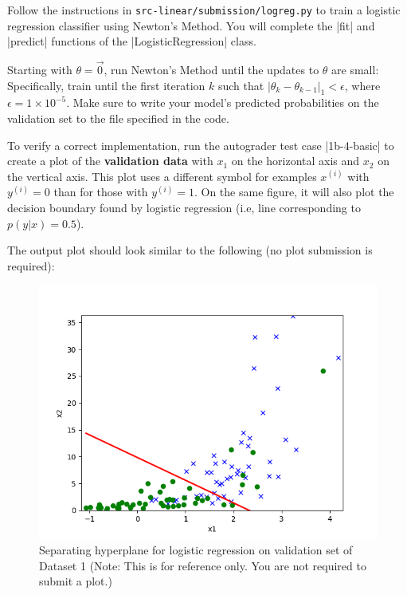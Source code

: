 \item {}
Follow the instructions in \texttt{src-linear/submission/logreg.py} to train a logistic regression classifier using Newton's Method. You will complete the |fit| and |predict| functions of the |LogisticRegression| class.

Starting with $\theta = \vec{0}$, run Newton's Method until the updates to $\theta$ are small: Specifically,  train until the first iteration $k$ such that $\vert\theta_{k} - \theta_{k-1}\vert_1 < \epsilon$, where $\epsilon = 1\times 10^{-5}$. Make sure to write your model's predicted probabilities on the validation set to the file specified in the code.

To verify a correct implementation, run the autograder test case |1b-4-basic| to create a plot of the \textbf{validation data} with $x_1$ on the horizontal axis and $x_2$ on the vertical axis. This plot uses a different symbol for examples $x^{(i)}$ with $y^{(i)} = 0$ than for those with $y^{(i)} = 1$. On the same figure, it will also plot the decision boundary found by logistic regression (i.e, line corresponding to $p(y\vert x) = 0.5$).

The output plot should look similar to the following (no plot submission is required): 

\begin{figure}[H]
	\centering
	\vspace{2mm}
	\includegraphics[width=0.65\linewidth]{01-linearclass/p01b_pred_1.png}
    \caption{Separating hyperplane for logistic regression on validation set of Dataset 1 (Note: This is for reference only.  You are not required to submit a plot.)}
\end{figure}
